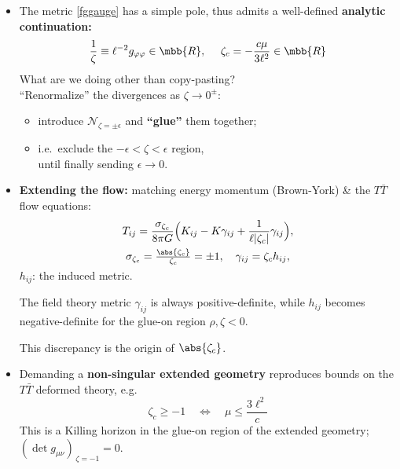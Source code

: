 \documentclass[10pt]{article}
\newcommand{\TTbar}{\texorpdfstring{\ensuremath{T\bar{T}}}{TTbar}\xspace}
\begin{document}
\begin{multicols}{3}
\begin{itemize}
\item The metric \eqref{fggauge} has a simple pole, thus admits a well-defined \textbf{analytic continuation:}
\begin{equation}
	\frac{1}{\zeta} \equiv \ell^{-2} g_{\varphi\varphi} \in \mbb{R},
\ \quad
	\zeta_c = - \frac{c \mu}{3\ell^2} \in \mbb{R}
\end{equation}
What are we doing other than copy-pasting?\\
``Renormalize'' the divergences as $\zeta \to 0^\pm$:
	\begin{itemize}[noitemsep]\small
	\item introduce $\mathcal N_{\zeta={\pm\epsilon}}$ and \textbf{``glue''} them together;
	\item i.e.~exclude the $-\epsilon < \zeta < \epsilon$ region, \\ until finally sending $\epsilon \to 0$. 
	\end{itemize}
	
\item \textbf{Extending the flow:} matching energy momentum (Brown-York) \& the \TTbar flow equations:
	\begin{equation}
	\begin{gathered}
		T_{ij}= \frac{\sigma_{\zeta_c}}{8\pi G} \Big( K_{ij} -  K \gamma_{ij} + \frac{1}{\ell |\zeta_c|}\gamma_{ij}\Big), \\ \sigma_{\zeta_c} = \tfrac{\abs{\zeta_c}}{\zeta_c} = \pm 1,\quad
		\gamma_{ij} = \zeta_c h_{ij}, \\[-1ex]
	\end{gathered}	\label{BYtensor}
	\end{equation}
	$h_{ij}$: the induced metric. 
	
	The field theory metric $\gamma_{ij}$ is always positive-definite, while $h_{ij}$ becomes negative-definite for the glue-on region $\rho,\zeta < 0$.
	
	This discrepancy is the origin of $\abs{\zeta_c}$.

%
%

\item Demanding a \textbf{non-singular extended geometry} reproduces bounds on the \TTbar deformed theory, e.g.
	\begin{equation}
		\zeta_c \ge -1 \quad \Leftrightarrow \quad\mu\le \frac{ 3\ell^2 }{c} \label{reality}
	\end{equation}
	This is a Killing horizon in the glue-on region of the \mbox{extended} geometry;
	$(\det g_{\mu\nu})_{\,\zeta = -1} = 0$.


\end{itemize}
\end{multicols}
\end{document}
